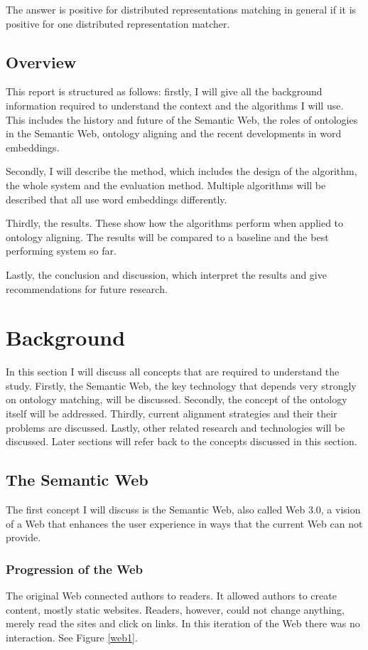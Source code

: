 \documentclass{article}
\begin{document}
 The answer is positive for distributed representations matching in general if it is positive for one distributed representation matcher.
 
 \subsection{Overview}
 This report is structured as follows: firstly, I will give all the background information required to understand the context and the algorithms I will use. This includes the history and future of the Semantic Web, the roles of ontologies in the Semantic Web, ontology aligning and the recent developments in word embeddings.
 
 Secondly, I will describe the method, which includes the design of the algorithm, the whole system and the evaluation method. Multiple algorithms will be described that all use word embeddings differently. 
 
 Thirdly, the results. These show how the algorithms perform when applied to ontology aligning. The results will be compared to a baseline and the best performing system so far.
 
 Lastly, the conclusion and discussion, which interpret the results and give recommendations for future research.
 
\newpage
\section{Background}
 In this section I will discuss all concepts that are required to understand the study. Firstly, the Semantic Web, the key technology that depends very strongly on ontology matching, will be discussed. Secondly, the concept of the ontology itself will be addressed. Thirdly, current alignment strategies and their their problems are discussed. Lastly, other related research and technologies will be discussed. Later sections will refer back to the concepts discussed in this section.
 \subsection{The Semantic Web}
  The first concept I will discuss is the Semantic Web, also called Web 3.0, a vision of a Web that enhances the user experience in ways that the current Web can not provide.
 \subsubsection{Progression of the Web}
 The original Web connected authors to readers. It allowed authors to create content, mostly static websites. Readers, however, could not change anything, merely read the sites and click on links. In this iteration of the Web there was no interaction\cite{web1}. See Figure \ref{web1}. 
 
\end{document}
